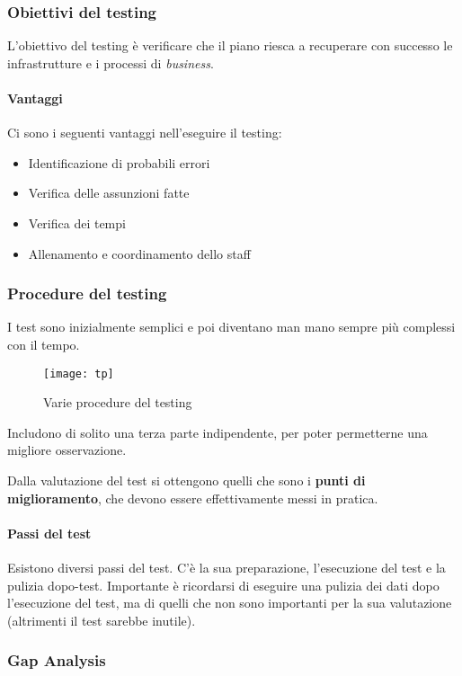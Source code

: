 \subsubsection{Obiettivi del testing}

L'obiettivo del testing è verificare che il piano riesca a recuperare con
successo le infrastrutture e i processi di \textit{business}.

\paragraph*{Vantaggi} Ci sono i seguenti vantaggi nell'eseguire il testing:
\begin{itemize}
  \item Identificazione di probabili errori
  \item Verifica delle assunzioni fatte
  \item Verifica dei tempi
  \item Allenamento e coordinamento dello staff
\end{itemize}

\subsubsection{Procedure del testing}

I test sono inizialmente semplici e poi diventano man mano sempre più complessi
con il tempo.

\begin{figure}[H]
 \centering
 \texttt{[image: tp]}
 \caption{Varie procedure del testing}
\end{figure}

Includono di solito una terza parte indipendente, per poter permetterne una
migliore osservazione.

Dalla valutazione del test si ottengono quelli che sono i \textbf{punti di
miglioramento}, che devono essere effettivamente messi in pratica.

\paragraph*{Passi del test} Esistono diversi passi del test. C'è la sua
preparazione, l'esecuzione del test e la pulizia dopo-test. Importante è
ricordarsi di eseguire una pulizia dei dati dopo l'esecuzione del test, ma di
quelli che non sono importanti per la sua valutazione (altrimenti il test
sarebbe inutile).

\subsubsection{Gap Analysis}

